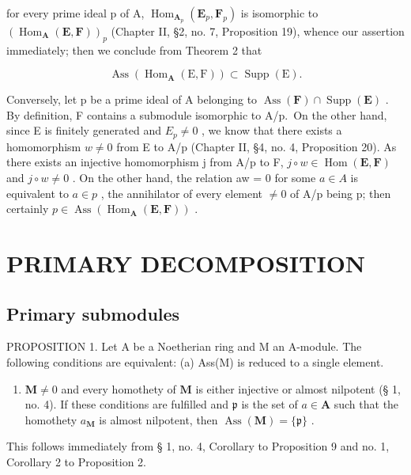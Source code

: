 for every prime ideal p of A, \(\operatorname{Hom}_{\mathbf{A}_{p}}(\mathbf{E}_{p}, \mathbf{F}_{p})\) is isomorphic to \((\operatorname{Hom}_{\mathbf{A}}(\mathbf{E}, \mathbf{F}))_{p}\) (Chapter II, §2, no. 7, Proposition 19), whence our assertion immediately; then we conclude from Theorem 2 that

\[
\operatorname{Ass} \left(\operatorname{Hom} _ {\mathbf {A}} (\mathrm{E}, \mathrm{F})\right) \subset \operatorname{Supp} (\mathrm{E}).
\]

Conversely, let p be a prime ideal of A belonging to \(\operatorname{Ass}(\mathbf{F}) \cap \operatorname{Supp}(\mathbf{E})\) . By definition, F contains a submodule isomorphic to A/p.~On the other hand, since E is finitely generated and \(E_{p} \neq 0\) , we know that there exists a homomorphism \(w \neq 0\) from E to A/p (Chapter II, §4, no. 4, Proposition 20). As there exists an injective homomorphism j from A/p to F, \(j \circ w \in \operatorname{Hom}(\mathbf{E}, \mathbf{F})\) and \(j \circ w \neq 0\) . On the other hand, the relation aw = 0 for some \(a \in A\) is equivalent to \(a \in p\) , the annihilator of every element \(\neq 0\) of A/p being p; then certainly \(p \in \operatorname{Ass}(\operatorname{Hom}_{\mathbf{A}}(\mathbf{E}, \mathbf{F}))\) .

\section{PRIMARY DECOMPOSITION}

\subsection{Primary submodules}

PROPOSITION 1. Let A be a Noetherian ring and M an A-module. The following conditions are equivalent: (a) Ass(M) is reduced to a single element.

\begin{enumerate}
\def\labelenumi{(\alph{enumi})}
\setcounter{enumi}{1}
\tightlist
\item
  \(\mathbf{M} \neq 0\) and every homothety of \(\mathbf{M}\) is either injective or almost nilpotent (§ 1, no. 4). If these conditions are fulfilled and \(\mathfrak{p}\) is the set of \(a \in \mathbf{A}\) such that the homothety \(a_{\mathbf{M}}\) is almost nilpotent, then \(\operatorname{Ass}(\mathbf{M}) = \{\mathfrak{p}\}\) .
\end{enumerate}

This follows immediately from § 1, no. 4, Corollary to Proposition 9 and no. 1, Corollary 2 to Proposition 2.

